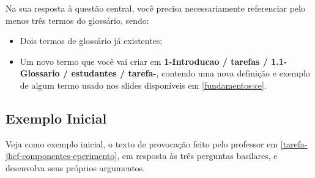 Na sua resposta à questão central, você precisa necessariamente referenciar pelo menos três termos do glossário, sendo:
\begin{itemize}
    \item Dois termos de glossário já existentes;
    \item Um novo termo que você vai criar em \textbf{ 1-Introducao / tarefas / 1.1-Glossario / estudantes / tarefa-\githubusername}, contendo uma nova definição e exemplo de algum termo usado nos slides disponíveis em \ref{fundamentos:ce}.
\end{itemize}

\subsection{Exemplo Inicial}

Veja como exemplo inicial, o texto de provocação feito pelo professor em \ref{tarefa-jhcf-componentes-eperimento}, em resposta às três perguntas basilares, e
desenvolva seus próprios argumentos.
